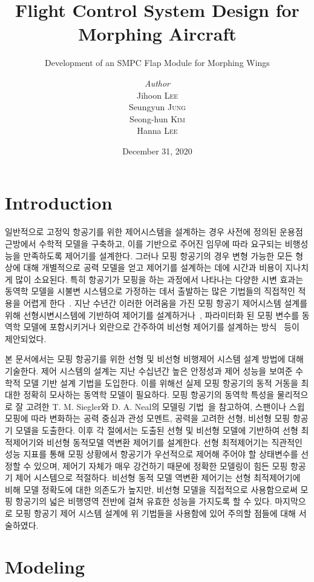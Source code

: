 \documentclass[a4paper, 12pt]{report}
\institute{Seoul National University}
\title{Flight Control System Design for Morphing Aircraft}
\subtitle{Development of an SMPC Flap Module for Morphing Wings}
\author{\textit{Author}\\Jihoon \textsc{Lee}\\Seungyun \textsc{Jung}\\Seong-hun \textsc{Kim}\\Hanna \textsc{Lee}}
\date{December 31, 2020}
\begin{document}
	\maketitle
	\romantableofcontents

	\chapter{Introduction}
	일반적으로 고정익 항공기를 위한 제어시스템을 설계하는 경우 사전에 정의된 운용점 근방에서 수학적 모델을 구축하고, 이를 기반으로 주어진 임무에 따라 요구되는 비행성능을 만족하도록 제어기를 설계한다.
	그러나 모핑 항공기의 경우 변형 가능한 모든 형상에 대해 개별적으로 공력 모델을 얻고 제어기를 설계하는 데에 시간과 비용이 지나치게 많이 소요된다.
	특히 항공기가 모핑을 하는 과정에서 나타나는 다양한 시변 효과는 동역학 모델을 시불변 시스템으로 가정하는 데서 출발하는 많은 기법들의 직접적인 적용을 어렵게 한다~\cite{seigler_analysis_2009,chakravarthy_time-varying_2012}.
	지난 수년간 이러한 어려움을 가진 모핑 항공기 제어시스템 설계를 위해  선형시변시스템에 기반하여 제어기를 설계하거나~\cite{jiang_systematic_2015,lee_linear_2019}, 파라미터화 된 모핑 변수를 동역학 모델에 포함시키거나 외란으로 간주하여 비선형 제어기를 설계하는 방식~\cite{wu_modified_2017,lee_neural_2019,jung_disturbance_2020} 등이 제안되었다.

	본 문서에서는 모핑 항공기를 위한 선형 및 비선형 비행제어 시스템 설계 방법에 대해 기술한다.
	제어 시스템의 설계는 지난 수십년간 높은 안정성과 제어 성능을 보여준 수학적 모델 기반 설계 기법을 도입한다.
	이를 위해선 실제 모핑 항공기의 동적 거동을 최대한 정확히 모사하는 동역학 모델이 필요하다.
	모핑 항공기의 동역학 특성을 물리적으로 잘 고려한 T. M. Siegler와 D. A. Neal의 모델링 기법~\cite{seigler_modeling_2007-1}을 참고하여, 스팬이나 스윕 모핑에 따라 변화하는 공력 중심과 관성 모멘트, 공력을 고려한 선형, 비선형 모핑 항공기 모델을 도출한다.
	이후 각 절에서는 도출된 선형 및 비선형 모델에 기반하여 선형 최적제어기와 비선형 동적모델 역변환 제어기를 설계한다.
	선형 최적제어기는 직관적인 성능 지표를 통해 모핑 상황에서 항공기가 우선적으로 제어해 주어야 할 상태변수를 선정할 수 있으며, 제어기 자체가 매우 강건하기 때문에 정확한 모델링이 힘든 모핑 항공기 제어 시스템으로 적절하다.
	비선형 동적 모델 역변환 제어기는 선형 최적제어기에 비해 모델 정확도에 대한 의존도가 높지만, 비선형 모델을 직접적으로 사용함으로써 모핑 항공기의 넓은 비행영역 전반에 걸쳐 유효한 성능을 가지도록 할 수 있다.
	마지막으로 모핑 항공기 제어 시스템 설계에 위 기법들을 사용함에 있어 주의할 점들에 대해 서술하였다.

	\chapter{Modeling}
\end{document}
